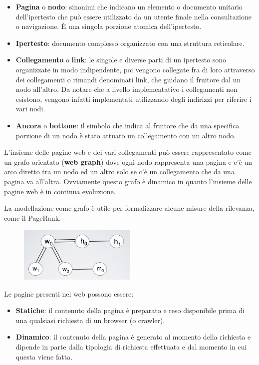 \begin{itemize}
	\item \textbf{Pagina} o \textbf{nodo}: sinonimi che indicano un elemento o documento unitario dell'ipertesto che può essere utilizzato da un utente finale nella consultazione o navigazione. \`E una singola porzione atomica dell'ipertesto.
	\item \textbf{Ipertesto}: documento complesso organizzato con una struttura reticolare.
	\item \textbf{Collegamento} o \textbf{link}: le singole e diverse parti di un ipertesto sono organizzate in modo indipendente, poi vengono collegate fra di loro attraverso dei collegamenti o rimandi denominati link, che guidano il fruitore dal un nodo all'altro. Da notare che a livello implementativo i collegamenti non esistono, vengono infatti implementati utilizzando degli indirizzi per riferire i vari nodi.
	\item \textbf{Ancora} o \textbf{bottone}: il simbolo che indica al fruitore che da una specifica porzione di un nodo è stato attuato un collegamento con un altro nodo.
\end{itemize}

L'insieme delle pagine web e dei vari collegamenti può essere rappresentato come un grafo orientato (\textbf{web graph}) dove ogni nodo rappresenta una pagina e c'è un arco diretto tra un nodo ed un altro solo se c'è un collegamento che da una pagina va all'altra.
Ovviamente questo grafo è dinamico in quanto l'insieme delle pagine web è in continua evoluzione.

La modellazione come grafo è utile per formalizzare alcune misure della rilevanza, come il PageRank.

\begin{figure}[htbp]
	\centering
	\includegraphics[width = 0.5\textwidth]{images/l17-fig-3}
\end{figure}

Le pagine presenti nel web possono essere:

\begin{itemize}
	\item \textbf{Statiche}: il contenuto della pagina è preparato e reso disponibile prima di una qualsiasi richiesta di un browser (o crawler).
	\item \textbf{Dinamico}: il contenuto della pagina è generato al momento della richiesta e dipende in parte dalla tipologia di richiesta effettuata e dal momento in cui questa viene fatta.
\end{itemize}

